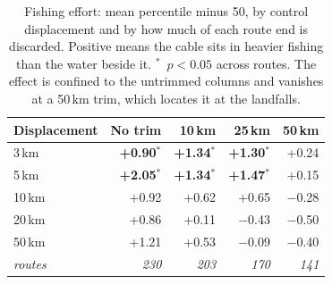 \begin{table}[t]
\caption{Fishing effort: mean percentile minus 50, by control displacement and
by how much of each route end is discarded. Positive means the cable
sits in heavier fishing than the water beside it. $^{*}$~$p<0.05$ across
routes. The effect is confined to the untrimmed columns and vanishes at a
50\,km trim, which locates it at the landfalls.}
\label{tab:fishing}
\centering\footnotesize
\begin{tabular}{@{}lrrrr@{}}
\toprule
Displacement & No trim & 10\,km & 25\,km & 50\,km \\
\midrule
3\,km & \textbf{+0.90}$^{*}$ & \textbf{+1.34}$^{*}$ & \textbf{+1.30}$^{*}$ & +0.24 \\
5\,km & \textbf{+2.05}$^{*}$ & \textbf{+1.34}$^{*}$ & \textbf{+1.47}$^{*}$ & +0.15 \\
10\,km & +0.92 & +0.62 & +0.65 & \ensuremath{-}0.28 \\
20\,km & +0.86 & +0.11 & \ensuremath{-}0.43 & \ensuremath{-}0.50 \\
50\,km & +1.21 & +0.53 & \ensuremath{-}0.09 & \ensuremath{-}0.40 \\
\midrule
\textit{routes} & \textit{230} & \textit{203} & \textit{170} & \textit{141} \\
\bottomrule
\end{tabular}
\end{table}
